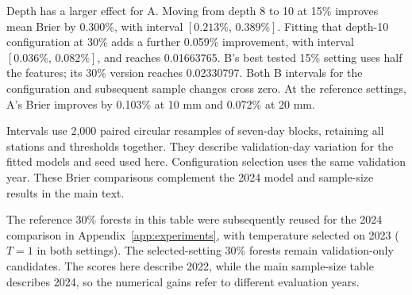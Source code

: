 \documentclass[11pt,a4paper]{article}
\begin{document}
Depth has a larger effect for A. Moving from depth 8 to 10 at 15\% improves mean Brier by 0.300\%, with interval $[0.213\%,\,0.389\%]$. Fitting that depth-10 configuration at 30\% adds a further 0.059\% improvement, with interval $[0.036\%,\,0.082\%]$, and reaches 0.01663765. B's best tested 15\% setting uses half the features; its 30\% version reaches 0.02330797. Both B intervals for the configuration and subsequent sample changes cross zero. At the reference settings, A's Brier improves by 0.103\% at 10 mm and 0.072\% at 20 mm.

Intervals use 2,000 paired circular resamples of seven-day blocks, retaining all stations and thresholds together. They describe validation-day variation for the fitted models and seed used here. Configuration selection uses the same validation year. These Brier comparisons complement the 2024 model and sample-size results in the main text.

The reference 30\% forests in this table were subsequently reused for the 2024 comparison in Appendix~\ref{app:experiments}, with temperature selected on 2023 ($T=1$ in both settings). The selected-setting 30\% forests remain validation-only candidates. The scores here describe 2022, while the main sample-size table describes 2024, so the numerical gains refer to different evaluation years.

\FloatBarrier
\end{document}
